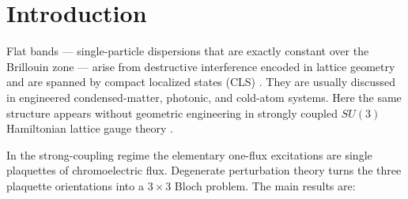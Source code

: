 \documentclass[11pt]{article}
\begin{document}
\section{Introduction}
\label{sec:intro}

Flat bands --- single-particle dispersions that are exactly constant over the
Brillouin zone --- arise from destructive interference encoded in lattice
geometry and are spanned by compact localized states (CLS)
\cite{Sutherland1986,Lieb1989,Mielke1991,Tasaki1992,BergmanWuBalents2008,
LeykamAndreanovFlach2018}. They are usually discussed in engineered
condensed-matter, photonic, and cold-atom systems. Here the same structure
appears without geometric engineering in strongly coupled $SU(3)$
Hamiltonian lattice gauge theory \cite{KogutSusskind1975}.

In the strong-coupling regime the elementary one-flux excitations are single
plaquettes of chromoelectric flux. Degenerate perturbation theory turns the
three plaquette orientations into a $3\times3$ Bloch problem. The main
results are:
\end{document}
